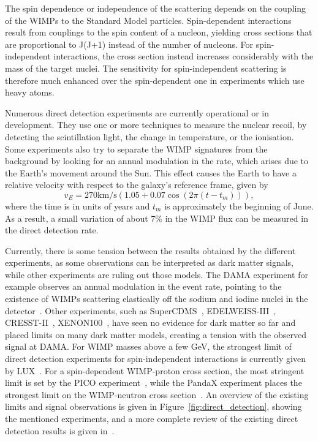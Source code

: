 The spin dependence or independence of the scattering depends on the coupling of the \acp{WIMP} to the Standard Model particles. Spin-dependent interactions result from couplings to the spin content of a nucleon, yielding cross sections that are proportional to J(J+1) instead of the number of nucleons. For spin-independent interactions, the cross section instead increases considerably with the mass of the target nuclei. The sensitivity for spin-independent scattering is therefore much enhanced over the spin-dependent one in experiments which use heavy atoms.

Numerous direct detection experiments are currently operational or in development. They use one or more techniques to measure the nuclear recoil, by detecting the scintillation light, the change in temperature, or the ionisation. Some experiments also try to separate the \ac{WIMP} signatures from the background by looking for an annual modulation in the rate, which arises due to the Earth's movement around the Sun. This effect causes the Earth to have a relative velocity with respect to the galaxy's reference frame, given by 
\begin{equation}
v_E = 270\mathrm{km/s}\left(1.05+0.07\cos(2\pi(t-t_m))\right),
\end{equation}
where the time is in units of years and $t_m$ is approximately the beginning of June. As a result, a small variation of about 7\% in the \ac{WIMP} flux can be measured in the direct detection rate. 

Currently, there is some tension between the results obtained by the different experiments, as some observations can be interpreted as dark matter signals, while other experiments are ruling out those models. The DAMA experiment for example observes an annual modulation in the event rate, pointing to the existence of \acp{WIMP} scattering elastically off the sodium and iodine nuclei in the detector~\cite{Bernabei:2013xsa}. 
Other experiments, such as SuperCDMS~\cite{Agnese:2014aze}, EDELWEISS-III~\cite{Armengaud:2016cvl}, CRESST-II~\cite{Angloher:2014myn}, XENON100~\cite{Aprile:2016swn}, have seen no evidence for dark matter so far and placed limits on many dark matter models, creating a tension with the observed signal at DAMA. For \ac{WIMP} masses above a few GeV, the strongest limit of direct detection experiments for spin-independent interactions is currently given by LUX~\cite{Akerib:2016vxi}. For a spin-dependent \ac{WIMP}-proton cross section, the most stringent limit is set by the PICO experiment~\cite{Amole:2017dex}, while the PandaX experiment places the strongest limit on the \ac{WIMP}-neutron cross section~\cite{Fu:2016ega}. An overview of the existing limits and signal observations is given in Figure~\ref{fig:direct_detection}, showing the mentioned experiments, and a more complete review of the existing direct detection results is given in~\cite{Undagoitia:2015gya}.

